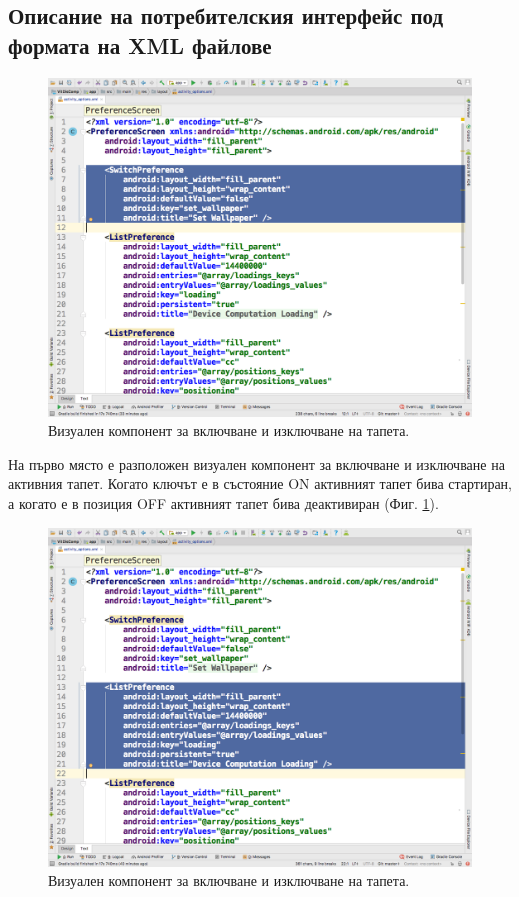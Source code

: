 \documentclass[book,14pt,oneside,openany]{memoir}
\begin{document}
\subsection{Описание на потребителския интерфейс под формата на XML файлове}

\begin{figure}[h]
  \centering
  \includegraphics[height=0.45\pdfpageheight]{./images/pic0021.png}
  \caption{Визуален компонент за включване и изключване на тапета.}
\label{fig:pic0021}
\end{figure}
\FloatBarrier

На първо място е разположен визуален компонент за включване и изключване на активния тапет. Когато ключът е в състояние ON активният тапет бива стартиран, а когато е в позиция OFF активният тапет бива деактивиран (Фиг. \ref{fig:pic0021}). 

\begin{figure}[h]
  \centering
  \includegraphics[height=0.45\pdfpageheight]{./images/pic0022.png}
  \caption{Визуален компонент за включване и изключване на тапета.}
\label{fig:pic0022}
\end{figure}
\FloatBarrier
\end{document}
